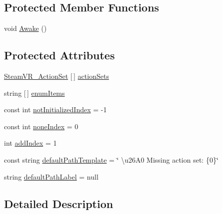 \subsection*{Protected Member Functions}
\begin{DoxyCompactItemize}
\item 
void \mbox{\hyperlink{class_valve_1_1_v_r_1_1_steam_v_r___input___action_set_property_editor_ac96a095b8a1e54a9cb1efbe6cd8fd588}{Awake}} ()
\end{DoxyCompactItemize}
\subsection*{Protected Attributes}
\begin{DoxyCompactItemize}
\item 
\mbox{\hyperlink{class_valve_1_1_v_r_1_1_steam_v_r___action_set}{Steam\+V\+R\+\_\+\+Action\+Set}} \mbox{[}$\,$\mbox{]} \mbox{\hyperlink{class_valve_1_1_v_r_1_1_steam_v_r___input___action_set_property_editor_a7d10921daafc5b145886341404e313d0}{action\+Sets}}
\item 
string \mbox{[}$\,$\mbox{]} \mbox{\hyperlink{class_valve_1_1_v_r_1_1_steam_v_r___input___action_set_property_editor_a6f85184391cbaf6b9553403947f19079}{enum\+Items}}
\item 
const int \mbox{\hyperlink{class_valve_1_1_v_r_1_1_steam_v_r___input___action_set_property_editor_a2be8e8b2504b572a5d00cfd4ba31da8b}{not\+Initialized\+Index}} = -\/1
\item 
const int \mbox{\hyperlink{class_valve_1_1_v_r_1_1_steam_v_r___input___action_set_property_editor_a76715775134cd70828036551c8965b8e}{none\+Index}} = 0
\item 
int \mbox{\hyperlink{class_valve_1_1_v_r_1_1_steam_v_r___input___action_set_property_editor_aeb816cefc649e2effd070212a6b4968b}{add\+Index}} = 1
\item 
const string \mbox{\hyperlink{class_valve_1_1_v_r_1_1_steam_v_r___input___action_set_property_editor_acc051368361abd6814780b7cf772070e}{default\+Path\+Template}} = \char`\"{} \textbackslash{}u26\+A0 Missing action set\+: \{0\}\char`\"{}
\item 
string \mbox{\hyperlink{class_valve_1_1_v_r_1_1_steam_v_r___input___action_set_property_editor_a2121d5fb57cc8743a40823506a5e4267}{default\+Path\+Label}} = null
\end{DoxyCompactItemize}


\subsection{Detailed Description}



